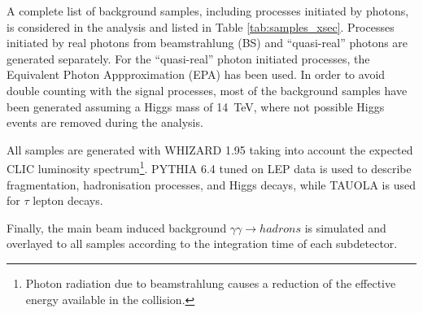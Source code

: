 A complete list of background samples, including processes initiated by photons, is considered in the analysis and listed in Table \ref{tab:samples_xsec}.
Processes initiated by real photons from beamstrahlung (BS) and ``quasi-real'' photons are generated separately. For the ``quasi-real'' photon initiated processes, the Equivalent Photon Appproximation (EPA) has been used. In order to avoid double counting with the signal processes, most of the background samples have been generated assuming a Higgs mass of \SI{14}{\TeV}, where not possible Higgs events are removed during the analysis.

All samples are generated with WHIZARD 1.95 \cite{} taking into account the expected CLIC luminosity spectrum\footnote{Photon radiation due to beamstrahlung causes a reduction of the effective energy available in the collision.}.
PYTHIA 6.4 \cite{} tuned on LEP data \cite{} is used to describe fragmentation, hadronisation processes, and Higgs decays, while TAUOLA \cite{} is used for $\tau$ lepton decays.

Finally, the main beam induced background $\gamma\gamma\to hadrons$ is simulated and overlayed \cite{} to all samples according to the integration time of each subdetector.  